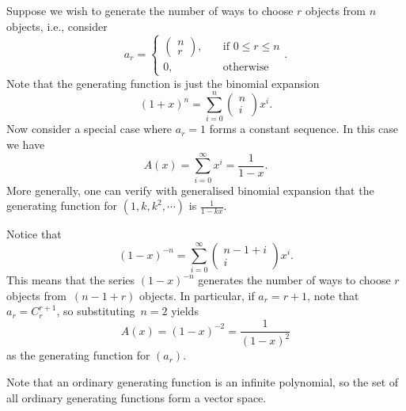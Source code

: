 \documentclass[math]{amznotes}
\theoremstyle{remark}
\begin{document}
Suppose we wish to generate the number of ways to choose $r$ objects from $n$ objects, i.e., consider
\begin{equation*}
    a_r = \begin{cases}
        \begin{pmatrix}
            n \\
            r
        \end{pmatrix}, & \quad\textrm{if } 0 \leq r \leq n \\
        0, & \quad\textrm{otherwise}
    \end{cases}.
\end{equation*}
Note that the generating function is just the binomial expansion
\begin{equation*}
    (1 + x)^n = \sum_{i = 0}^{n}\begin{pmatrix}
        n \\
        i
    \end{pmatrix}x^i.
\end{equation*}
Now consider a special case where $a_r = 1$ forms a constant sequence. In this case we have
\begin{equation*}
    A(x) = \sum_{i = 0}^{\infty}x^i = \frac{1}{1 - x}.
\end{equation*}
More generally, one can verify with generalised binomial expansion that the generating function for $\left(1, k, k^2, \cdots\right)$ is $\frac{1}{1 - kx}$.

Notice that
\begin{equation*}
    (1 - x)^{-n} = \sum_{i = 0}^{\infty}\begin{pmatrix}
        n - 1 + i \\
        i
    \end{pmatrix}x^i.
\end{equation*}
This means that the series $(1 - x)^{-n}$ generates the number of ways to choose $r$ objects from~$(n - 1 + r)$ objects. In particular, if $a_r = r + 1$, note that $a_r = C^{r + 1}_r$, so substituting~$n = 2$ yields
\begin{equation*}
    A(x) = (1 - x)^{-2} = \frac{1}{(1 - x)^2}
\end{equation*}
as the generating function for $(a_r)$.

Note that an ordinary generating function is an infinite polynomial, so the set of all ordinary generating functions form a vector space. 
\end{document}
